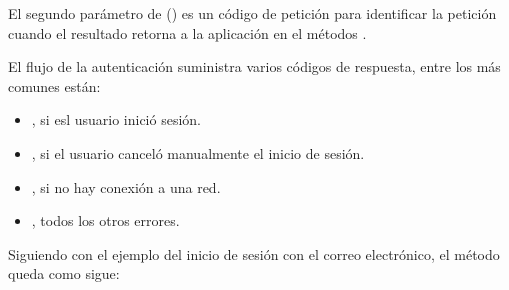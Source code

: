 %
\begin{sphinxVerbatim}[commandchars=\\\{\}]
      


\end{sphinxVerbatim}

El segundo parámetro de  ()  es un
código de petición para identificar la petición cuando el resultado retorna
a la aplicación en el métodos .

El flujo de la autenticación suministra varios códigos de respuesta, entre
los más comunes están:
\begin{itemize}
\item {} 
, si esl usuario inició sesión.

\item {} 
, si el usuario canceló manualmente el inicio de sesión.

\item {} 
, si no hay conexión a una red.

\item {} 
,  todos los otros errores.

\end{itemize}

Siguiendo con el ejemplo del inicio de sesión con el correo electrónico,
el método  queda como sigue:

